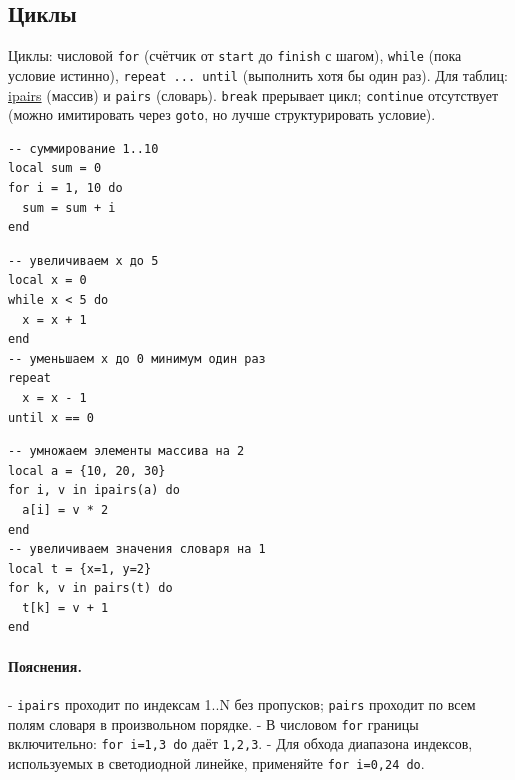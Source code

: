 \subsection{Циклы}
Циклы: числовой \verb|for| (счётчик от \verb|start| до \verb|finish| с шагом), \verb|while| (пока условие истинно), \verb|repeat ... until| (выполнить хотя бы один раз). Для таблиц: \hyperlink{term:ipairs}{ipairs} (массив) и \verb|pairs| (словарь). \verb|break| прерывает цикл; \verb|continue| отсутствует (можно имитировать через \verb|goto|, но лучше структурировать условие).
\begin{verbatim}
-- суммирование 1..10
local sum = 0
for i = 1, 10 do
  sum = sum + i
end
\end{verbatim}
\begin{verbatim}
-- увеличиваем x до 5
local x = 0
while x < 5 do
  x = x + 1
end
-- уменьшаем x до 0 минимум один раз
repeat
  x = x - 1
until x == 0
\end{verbatim}
\begin{verbatim}
-- умножаем элементы массива на 2
local a = {10, 20, 30}
for i, v in ipairs(a) do
  a[i] = v * 2
end
-- увеличиваем значения словаря на 1
local t = {x=1, y=2}
for k, v in pairs(t) do
  t[k] = v + 1
end
\end{verbatim}
\paragraph{Пояснения.}
- \verb|ipairs| проходит по индексам 1..N без пропусков; \verb|pairs| проходит по всем полям словаря в произвольном порядке.
- В числовом \verb|for| границы включительно: \verb|for i=1,3 do| даёт \verb|1,2,3|.
- Для обхода диапазона индексов, используемых в светодиодной линейке, применяйте \verb|for i=0,24 do|.
